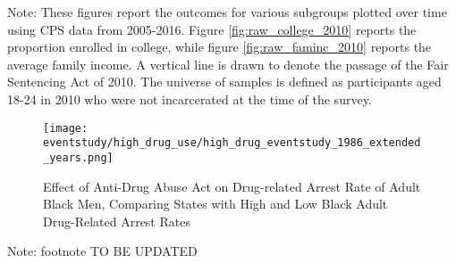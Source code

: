   \begin{footnotesize}
    \noindent Note: These figures report the outcomes for various subgroups plotted over time using CPS data from 2005-2016. Figure \ref{fig:raw_college_2010} reports the proportion enrolled in college, while figure \ref{fig:raw_faminc_2010} reports the average family income. A vertical line is drawn to denote the passage of the Fair Sentencing Act of 2010. The universe of samples is defined as participants aged 18-24 in 2010 who were not incarcerated at the time of the survey.
  \end{footnotesize}

  \clearpage

  \begin{figure}[h]
    \caption{Effect of Anti-Drug Abuse Act on Drug-related Arrest Rate of Adult Black Men, Comparing States with High and Low Black Adult Drug-Related Arrest Rates}
    \centering
    \texttt{[image: eventstudy/high\_drug\_use/high\_drug\_eventstudy\_1986\_extended\_years.png]}
    \label{fig:b1}
  \end{figure}
  \begin{footnotesize}
    \noindent Note: footnote TO BE UPDATED
  \end{footnotesize}


